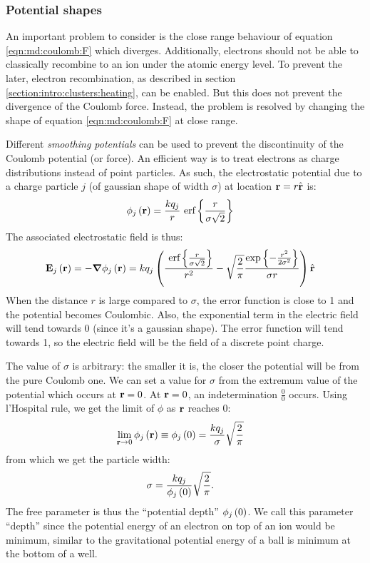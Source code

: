 



\subsubsection{Potential shapes}

An important problem to consider is the close range behaviour of equation
\eqref{eqn:md:coulomb:F} which diverges. Additionally, electrons should not be
able to classically recombine to an ion under the atomic energy level. To
prevent the later, electron recombination, as described in section
\ref{section:intro:clusters:heating}, can be enabled. But this does not prevent
the divergence of the Coulomb force. Instead, the problem is resolved by
changing the shape of equation \eqref{eqn:md:coulomb:F} at close range.

Different \textit{smoothing potentials} can be used to prevent the
discontinuity of the Coulomb potential (or force). An efficient way is to treat
electrons as charge distributions instead of point particles. As such, the
electrostatic potential due to a charge particle $j$ (of gaussian shape of
width $\sigma$) at location $\textbf{r} = r \hat{\textbf{r}}$ is:
\begin{align}
\phi_{j}\left( \textbf{r} \right) & = \frac{k q_j}{r} ~\textrm{erf} \left\{\frac{r}{\sigma \sqrt{2}}\right\}
\label{eqn:md:smoothed:phi}
\end{align}
The associated electrostatic field is thus:
\begin{align}
\textbf{E}_{j}\left( \textbf{r} \right) & = -\bm{\nabla} \phi_j\left( \textbf{r} \right) = k q_j \left( 
    \frac{ ~\textrm{erf} \left\{\frac{r}{\sigma\sqrt{2}}\right\} }{r^2}
    - \sqrt{\frac{2}{\pi}} \frac{ \exp{ \left\{ -\frac{r^2}{2 \sigma^2} \right\}} }{\sigma r}
 \right) \hat{\textbf{r}}
\label{eqn:md:smoothed:E}
\end{align}
When the distance $r$ is large compared to $\sigma$, the error function
is close to 1 and the potential becomes Coulombic. Also, the exponential
term in the electric field will tend towards 0 (since it's a gaussian shape).
The error function will tend towards 1, so the electric field will
be the field of a discrete point charge.

The value of $\sigma$ is arbitrary: the smaller it is, the closer the potential
will be from the pure Coulomb one. We can set a value for $\sigma$ from the
extremum value of the potential which occurs at $\textbf{r} = 0$. At $\textbf{r} = 0$, an
indetermination $\frac{0}{0}$ occurs. Using l'Hospital rule, we get the limit
of $\phi$ as $\textbf{r}$ reaches 0:
\begin{align}
\lim_{\textbf{r} \rightarrow 0} \phi_j\left( \textbf{r} \right)
    & \equiv \phi_j\left( 0 \right) = \frac{ k q_j }{ \sigma } \sqrt{\frac{2}{\pi}}
\end{align}
from which we get the particle width:
\begin{align}
\sigma & = \frac{ k q_j }{ \phi_j\left( 0 \right) } \sqrt{ \frac{2}{\pi}}.
\label{eqn:md:sigma}
\end{align}
The free parameter is thus the ``potential depth'' $\phi_j\left( 0 \right)$. We call this
parameter ``depth'' since the potential energy of an electron on top of an ion
would be minimum, similar to the gravitational potential energy of a ball is
minimum at the bottom of a well.


